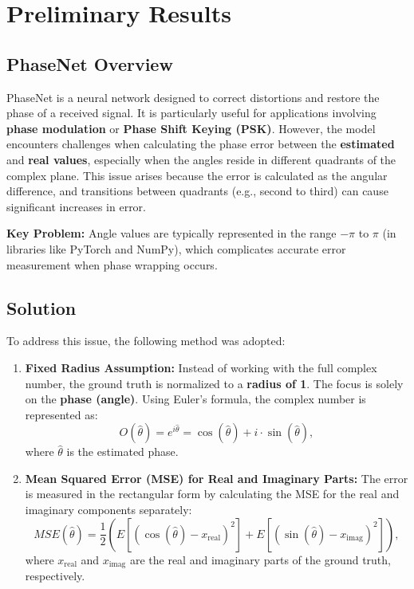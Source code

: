 \section{Preliminary Results}

\subsection{PhaseNet Overview}

PhaseNet is a neural network designed to correct distortions and restore the phase of a received signal. It is particularly useful for applications involving \textbf{phase modulation} or \textbf{Phase Shift Keying (PSK)}. However, the model encounters challenges when calculating the phase error between the \textbf{estimated} and \textbf{real values}, especially when the angles reside in different quadrants of the complex plane. This issue arises because the error is calculated as the angular difference, and transitions between quadrants (e.g., second to third) can cause significant increases in error.

\textbf{Key Problem:} Angle values are typically represented in the range \(-\pi\) to \(\pi\) (in libraries like PyTorch and NumPy), which complicates accurate error measurement when phase wrapping occurs.

\subsection*{Solution}
To address this issue, the following method was adopted:
\begin{enumerate}
    \item \textbf{Fixed Radius Assumption:} Instead of working with the full complex number, the ground truth is normalized to a \textbf{radius of 1}. The focus is solely on the \textbf{phase (angle)}. Using Euler's formula, the complex number is represented as:
    \[
    O(\hat{\theta}) = e^{i\hat{\theta}} = \cos(\hat{\theta}) + i \cdot \sin(\hat{\theta}),
    \]
    where \(\hat{\theta}\) is the estimated phase.

    \item \textbf{Mean Squared Error (MSE) for Real and Imaginary Parts:}  
    The error is measured in the rectangular form by calculating the MSE for the real and imaginary components separately:
    \[
    MSE(\hat{\theta}) = \frac{1}{2} \left( E \left[ (\cos(\hat{\theta}) - x_{\text{real}})^2 \right] + E \left[ (\sin(\hat{\theta}) - x_{\text{imag}})^2 \right] \right),
    \]
    where \(x_{\text{real}}\) and \(x_{\text{imag}}\) are the real and imaginary parts of the ground truth, respectively.
\end{enumerate}

